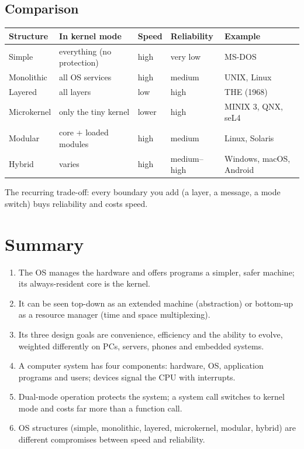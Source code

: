 \documentclass[11pt,a4paper]{article}
\begin{document}
\subsection{Comparison}

\begin{center}
\renewcommand{\arraystretch}{1.3}
\begin{tabular}{@{}lllll@{}}
\toprule
\textbf{Structure} & \textbf{In kernel mode} & \textbf{Speed} & \textbf{Reliability} & \textbf{Example} \\
\midrule
Simple & everything (no protection) & high & very low & MS-DOS \\
Monolithic & all OS services & high & medium & UNIX, Linux \\
Layered & all layers & low & high & THE (1968) \\
Microkernel & only the tiny kernel & lower & high & MINIX 3, QNX, seL4 \\
Modular & core + loaded modules & high & medium & Linux, Solaris \\
Hybrid & varies & high & medium--high & Windows, macOS, Android \\
\bottomrule
\end{tabular}
\end{center}

The recurring trade-off: every boundary you add (a layer, a message, a mode switch) buys reliability and costs speed.

\section{Summary}

\begin{keyidea}
\begin{enumerate}[leftmargin=1.4em]
  \item The OS manages the hardware and offers programs a simpler, safer machine; its always-resident core is the kernel.
  \item It can be seen top-down as an extended machine (abstraction) or bottom-up as a resource manager (time and space multiplexing).
  \item Its three design goals are convenience, efficiency and the ability to evolve, weighted differently on PCs, servers, phones and embedded systems.
  \item A computer system has four components: hardware, OS, application programs and users; devices signal the CPU with interrupts.
  \item Dual-mode operation protects the system; a system call switches to kernel mode and costs far more than a function call.
  \item OS structures (simple, monolithic, layered, microkernel, modular, hybrid) are different compromises between speed and reliability.
\end{enumerate}
\end{keyidea}
\end{document}
